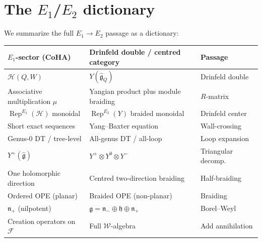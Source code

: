 \documentclass[11pt]{article}
\theoremstyle{definition}
\theoremstyle{remark}
\newcommand{\Rep}{\operatorname{Rep}}
\newcommand{\CoHA}{\mathcal{H}}
\newcommand{\cF}{\mathcal{F}}
\newcommand{\cW}{\mathcal{W}}
\newcommand{\frakg}{\mathfrak{g}}
\newcommand{\frakn}{\mathfrak{n}}
\newcommand{\frakh}{\mathfrak{h}}
\begin{document}
\section{The $E_1$/$E_2$ dictionary}
\label{sec:e1-e2-dictionary}

We summarize the full $E_1 \to E_2$ passage as a dictionary:

\begin{center}
\renewcommand{\arraystretch}{1.5}
\begin{tabular}{lll}
 \textbf{$E_1$-sector (CoHA)} & \textbf{Drinfeld double / centred category} & \textbf{Passage} \\
 \hline
 $\CoHA(Q,W)$ & $Y(\widehat{\frakg}_Q)$ & Drinfeld double \\
 Associative multiplication $\mu$ & Yangian product plus module braiding & $R$-matrix \\
 $\Rep^{E_1}(\CoHA)$ monoidal & $\Rep^{E_2}(Y)$ braided monoidal & Drinfeld center \\
 Short exact sequences & Yang--Baxter equation & Wall-crossing \\
 Genus-0 DT / tree-level & All-genus DT / all-loop & Loop expansion \\
 $Y^+(\widehat{\frakg})$ & $Y^+ \otimes Y^0 \otimes Y^-$ & Triangular decomp. \\
 One holomorphic direction & Centred two-direction braiding & Half-braiding \\
 Ordered OPE (planar) & Braided OPE (non-planar) & Braiding \\
 $\frakn_+$ (nilpotent) & $\frakg = \frakn_- \oplus \frakh \oplus \frakn_+$ & Borel--Weyl \\
 Creation operators on $\cF$ & Full $\cW$-algebra & Add annihilation \\
\end{tabular}
\end{center}
\end{document}
